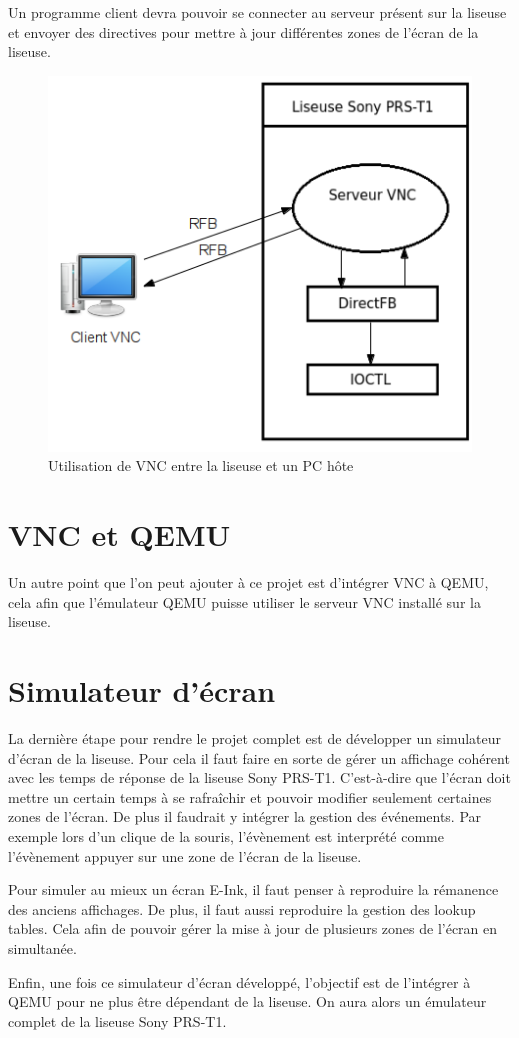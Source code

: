 Un programme client devra pouvoir se connecter au serveur présent sur la liseuse et envoyer des directives pour mettre à jour différentes zones de l'écran de la liseuse.

\begin{figure}[h!]
	\begin{center}
		\includegraphics{VNCClientServeur.png}
		\caption{Utilisation de VNC entre la liseuse et un PC hôte}
	\end{center}
\end{figure}

\section{VNC et QEMU}

Un autre point que l'on peut ajouter à ce projet est d'intégrer VNC à QEMU, cela afin que l'émulateur QEMU puisse utiliser le serveur VNC installé sur la liseuse.


\section{Simulateur d'écran}

La dernière étape pour rendre le projet complet est de développer un simulateur d'écran de la liseuse. Pour cela il faut faire en sorte de gérer un affichage cohérent avec les temps de réponse de la liseuse Sony PRS-T1. C'est-à-dire que l'écran doit mettre un certain temps à se rafraîchir et pouvoir modifier seulement certaines zones de l'écran. De plus il faudrait y intégrer la gestion des événements. Par exemple lors d'un clique de la souris, l'évènement est interprété comme l'évènement appuyer sur une zone de l'écran de la liseuse.

Pour simuler au mieux un écran E-Ink, il faut penser à reproduire la rémanence des anciens affichages. De plus, il faut aussi reproduire la gestion des lookup tables. Cela afin de pouvoir gérer la mise à jour de plusieurs zones de l'écran en simultanée.

Enfin, une fois ce simulateur d'écran développé, l'objectif est de l'intégrer à QEMU pour ne plus être dépendant de la liseuse. On aura alors un émulateur complet de la liseuse Sony PRS-T1.
